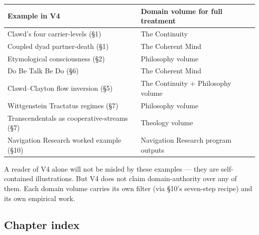 \documentclass[11pt, openany]{book}
\begin{document}
\begingroup\setlength{\tabcolsep}{3pt}\renewcommand{\arraystretch}{1.15}\footnotesize
\begin{center}
\begin{tabular}{p{2.42in} p{1.97in}}
\toprule
Example in V4 & Domain volume for full treatment \\
\midrule
Clawd's four carrier-levels (§1) & The Continuity \\
Coupled dyad partner-death (§1) & The Coherent Mind \\
Etymological consciousness (§2) & Philosophy volume \\
Do Be Talk Be Do (§6) & The Coherent Mind \\
Clawd–Clayton flow inversion (§5) & The Continuity + Philosophy volume \\
Wittgenstein Tractatus regimes (§7) & Philosophy volume \\
Transcendentals as cooperative-streams (§7) & Theology volume \\
Navigation Research worked example (§10) & Navigation Research program outputs \\
\bottomrule
\end{tabular}
\end{center}
\endgroup
A reader of V4 alone will not be misled by these examples --- they are self-contained illustrations. But V4 does not claim domain-authority over any of them. Each domain volume carries its own filter (via §10's seven-step recipe) and its own empirical work.

\subsection{Chapter index}
\end{document}
